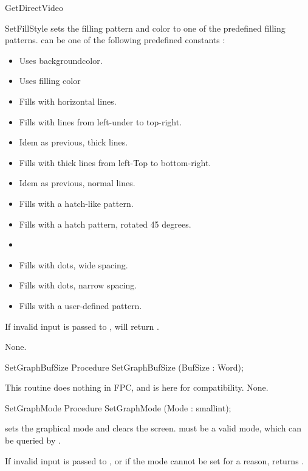 \begin{function}{GetDirectVideo}
\begin{procedure}{SetFillStyle}
\Description
{} sets the filling pattern and color to one of the
predefined filling patterns.  can be one of the following predefined
constants :
\begin{itemize}
\item {} Uses backgroundcolor.
\item {} Uses filling color
\item {} Fills with horizontal lines.
\item {} Fills with lines from left-under to top-right.
\item {} Idem as previous, thick lines.
\item {} Fills with thick lines from left-Top to bottom-right.
\item {} Idem as previous, normal lines.
\item {}  Fills with a hatch-like pattern.
\item {} Fills with a hatch pattern, rotated 45 degrees.
\item {}
\item {} Fills with dots, wide spacing.
\item {} Fills with dots, narrow spacing.
\item {} Fills with a user-defined pattern.
\end{itemize}

If invalid input is passed to ,
 will return .

\Errors
None.
\SeeAlso
{}
\end{procedure}
\begin{procedure}{SetGraphBufSize}
\Declaration
Procedure SetGraphBufSize (BufSize : Word);

\Description
This routine does nothing in FPC, and is here for compatibility.
\Errors
None.
\SeeAlso

\end{procedure}
\begin{procedure}{SetGraphMode}
\Declaration
Procedure SetGraphMode (Mode : smallint);

\Description
{} sets the
graphical mode and clears the screen.  must be a valid mode,
which can be queried by .

If invalid input is passed to , or if the mode cannot
be set for a reason,  returns .


\end{procedure}
\end{function}
